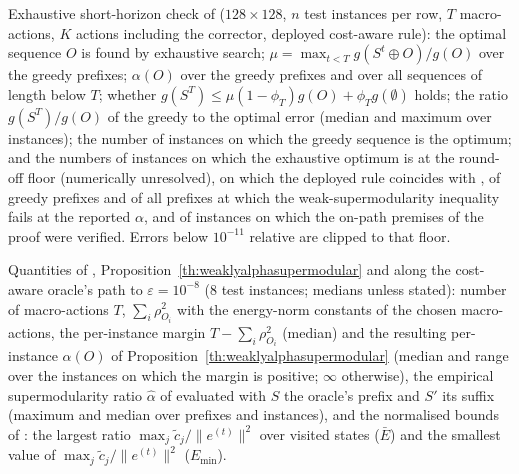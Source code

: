 \begin{table}[H]
\color{red}
\centering
\caption{Exhaustive short-horizon check of  ($128\times128$, $n$ test instances per row, $T$ macro-actions, $K$ actions including the corrector, deployed cost-aware rule): the optimal sequence $O$ is found by exhaustive search; $\mu = \max_{t<T} g(S^t \oplus O)/g(O)$ over the greedy prefixes; $\alpha(O)$ over the greedy prefixes and over all sequences of length below $T$; whether $g(S^T) \le \mu(1-\phi_T)g(O) + \phi_T g(\emptyset)$ holds; the ratio $g(S^T)/g(O)$ of the greedy to the optimal error (median and maximum over instances); the number of instances on which the greedy sequence is the optimum; and the numbers of instances on which the exhaustive optimum is at the round-off floor (numerically unresolved), on which the deployed rule coincides with , of greedy prefixes and of all prefixes at which the weak-supermodularity inequality fails at the reported $\alpha$, and of instances on which the on-path premises of the proof were verified. Errors below $10^{-11}$ relative are clipped to that floor.}
\resizebox{\textwidth}{!}{\catheorem}
\label{tab:ca_theorem}
\end{table}

\begin{table}[H]
\color{red}
\centering
\caption{Quantities of , Proposition~\ref{th:weaklyalphasupermodular} and  along the cost-aware oracle's path to $\varepsilon = 10^{-8}$ ($8$ test instances; medians unless stated): number of macro-actions $T$, $\sum_i\rho_{O_i}^2$ with the energy-norm constants of the chosen macro-actions, the per-instance margin $T - \sum_i\rho_{O_i}^2$ (median) and the resulting per-instance $\alpha(O)$ of Proposition~\ref{th:weaklyalphasupermodular} (median and range over the instances on which the margin is positive; $\infty$ otherwise), the empirical supermodularity ratio $\hat\alpha$ of  evaluated with $S$ the oracle's prefix and $S'$ its suffix (maximum and median over prefixes and instances), and the normalised bounds of : the largest ratio $\max_j \tilde c_j/\|e^{(t)}\|^2$ over visited states ($\bar E$) and the smallest value of $\max_j \tilde c_j/\|e^{(t)}\|^2$ ($E_{\min}$).}
\resizebox{\textwidth}{!}{\caassumpB}
\label{tab:ca_assump_paths}
\end{table}
